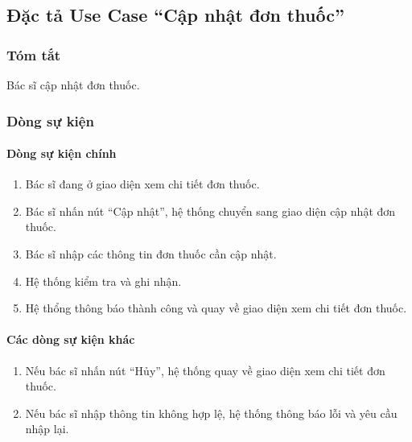 \subsection{Đặc tả Use Case ``Cập nhật đơn thuốc''}

\subsubsection{Tóm tắt}
Bác sĩ cập nhật đơn thuốc.

\subsubsection{Dòng sự kiện}
\paragraph{\textbf{Dòng sự kiện chính}}
\begin{enumerate}
  \item Bác sĩ đang ở giao diện xem chi tiết đơn thuốc.
  \item Bác sĩ nhấn nút ``Cập nhật'', hệ thống chuyển sang giao diện cập nhật đơn thuốc.
  \item Bác sĩ nhập các thông tin đơn thuốc cần cập nhật.
  \item Hệ thống kiểm tra và ghi nhận.
  \item Hệ thổng thông báo thành công và quay về giao diện xem chi tiết đơn thuốc.
\end{enumerate}

\paragraph{\textbf{Các dòng sự kiện khác}}
\begin{enumerate}
  \item Nếu bác sĩ nhấn nút ``Hủy'', hệ thống quay về giao diện xem chi tiết đơn thuốc.
  \item Nếu bác sĩ nhập thông tin không hợp lệ, hệ thống thông báo lỗi và yêu cầu nhập lại.
\end{enumerate}

